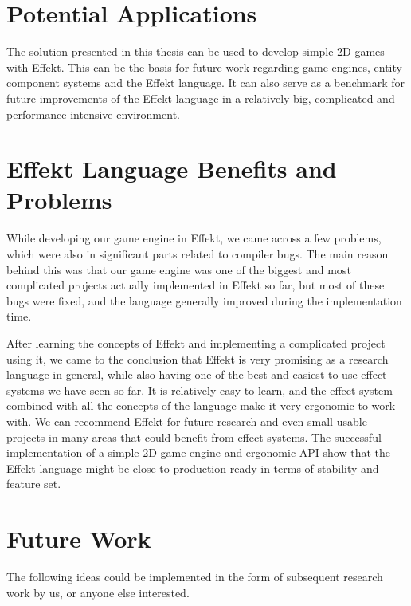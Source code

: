\section*{Potential Applications}

The solution presented in this thesis can be used to develop simple 2D games with Effekt. This can be the basis for future work regarding game engines, entity component systems and the Effekt language. It can also serve as a benchmark for future improvements of the Effekt language in a relatively big, complicated and performance intensive environment.

\section*{Effekt Language Benefits and Problems}

While developing our game engine in Effekt, we came across a few problems, which were also in significant parts related to compiler bugs. The main reason behind this was that our game engine was one of the biggest and most complicated projects actually implemented in Effekt so far, but most of these bugs were fixed, and the language generally improved during the implementation time.

After learning the concepts of Effekt and implementing a complicated project using it, we came to the conclusion that Effekt is very promising as a research language in general, while also having one of the best and easiest to use effect systems we have seen so far. It is relatively easy to learn, and the effect system combined with all the concepts of the language make it very ergonomic to work with. We can recommend Effekt for future research and even small usable projects in many areas that could benefit from effect systems. The successful implementation of a simple 2D game engine and ergonomic API show that the Effekt language might be close to production-ready in terms of stability and feature set.

\section*{Future Work}

The following ideas could be implemented in the form of subsequent research work by us, or anyone else interested.

